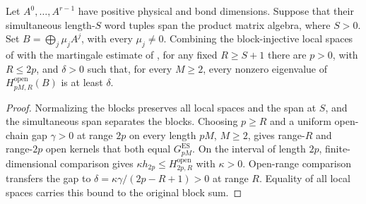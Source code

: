 \begin{lemma}
    \label{thm:block_open_gap_subsequence_simultaneous_injectivity}
    \leanok
    Let $A^0,\ldots,A^{r-1}$ have positive physical and bond dimensions.
    Suppose that their simultaneous length-$S$ word tuples span the product
    matrix algebra, where $S>0$. Set $B=\bigoplus_j\mu_jA^j$, with
    every $\mu_j\neq0$. Combining the block-injective local spaces of
    \cite[Section~IV.C]{Cirac2021Matrix} with the martingale estimate of
    \cite[Theorem~2.1(ii) and Section~6]{Nachtergaele1996Spectral}, for any
    fixed $R\geq S+1$ there are $p>0$, with $R\leq2p$, and $\delta>0$ such
    that, for every $M\geq2$, every nonzero eigenvalue of
    $H^{\mathrm{open}}_{pM,R}(B)$ is at least $\delta$.
\end{lemma}
\begin{proof}
    \leanok
    Normalizing the blocks preserves all local spaces and the span at $S$,
    and the simultaneous span separates the blocks. Choosing $p\geq R$ and a
    uniform open-chain gap $\gamma>0$ at range $2p$ on every length $pM$,
    $M\geq2$, gives range-$R$ and range-$2p$ open kernels that both equal
    $G_{pM}^{\mathrm{ES}}$. On the interval of length $2p$, finite-dimensional
    comparison gives $\kappa h_{2p}\leq H^{\mathrm{open}}_{2p,R}$ with
    $\kappa>0$. Open-range comparison transfers the gap to
    $\delta=\kappa\gamma/(2p-R+1)>0$ at range $R$. Equality of all local
    spaces carries this bound to the original block sum.
\end{proof}

